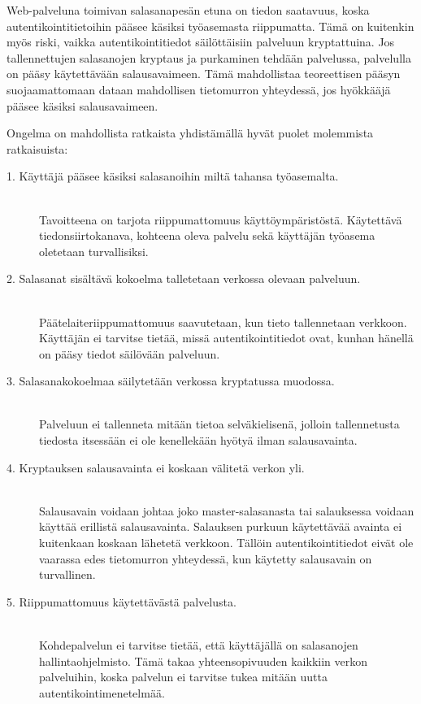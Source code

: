 \documentclass[english,gradu]{tktltiki}
\begin{document}
         Web-palveluna toimivan salasanapesän etuna on tiedon saatavuus, koska autentikointitietoihin pääsee käsiksi työasemasta riippumatta. Tämä on kuitenkin myös riski, vaikka autentikointitiedot säilöttäisiin palveluun kryptattuina. Jos tallennettujen salasanojen kryptaus ja purkaminen tehdään palvelussa, palvelulla on pääsy käytettävään salausavaimeen. Tämä mahdollistaa teoreettisen pääsyn suojaamattomaan dataan mahdollisen tietomurron yhteydessä, jos hyökkääjä pääsee käsiksi salausavaimeen.

         Ongelma on mahdollista ratkaista yhdistämällä hyvät puolet molemmista ratkaisuista:

         \begin{description}

           \item[1. Käyttäjä pääsee käsiksi salasanoihin miltä tahansa työasemalta.] \hfill \\
               Tavoitteena on tarjota riippumattomuus käyttöympäristöstä.
               Käytettävä tiedonsiirtokanava, kohteena oleva palvelu sekä käyttäjän työasema oletetaan turvallisiksi.

           \item[2. Salasanat sisältävä kokoelma talletetaan verkossa olevaan palveluun.] \hfill \\
               Päätelaiteriippumattomuus saavutetaan, kun tieto tallennetaan verkkoon.
               Käyttäjän ei tarvitse tietää, missä autentikointitiedot ovat, kunhan hänellä on pääsy
               tiedot säilövään palveluun.

           \item[3. Salasanakokoelmaa säilytetään verkossa kryptatussa muodossa.] \hfill \\
               Palveluun ei tallenneta mitään tietoa selväkielisenä, jolloin tallennetusta tiedosta itsessään
               ei ole kenellekään hyötyä ilman salausavainta.

           \item[4. Kryptauksen salausavainta ei koskaan välitetä verkon yli.] \hfill \\
               Salausavain voidaan johtaa joko master-salasanasta tai salauksessa voidaan käyttää erillistä
               salausavainta. Salauksen purkuun käytettävää avainta ei kuitenkaan koskaan lähetetä verkkoon. Tällöin
               autentikointitiedot eivät ole vaarassa edes tietomurron yhteydessä, kun käytetty salausavain on
               turvallinen.

           \item[5. Riippumattomuus käytettävästä palvelusta.] \hfill \\
               Kohdepalvelun ei tarvitse tietää, että käyttäjällä on salasanojen hallintaohjelmisto.
               Tämä takaa yhteensopivuuden kaikkiin verkon palveluihin, koska palvelun ei tarvitse tukea mitään uutta
               autentikointimenetelmää.

         \end{description}
\end{document}
